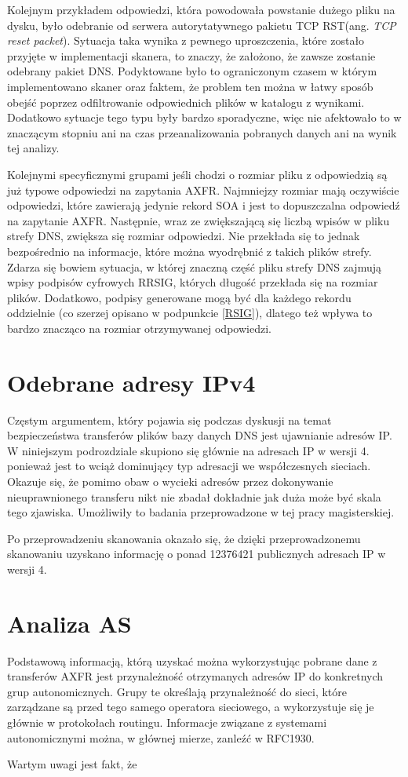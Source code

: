 Kolejnym przykładem odpowiedzi, która powodowała powstanie dużego pliku na dysku, było odebranie od serwera autorytatywnego pakietu TCP RST(ang. \textit{TCP reset packet}). Sytuacja taka wynika z pewnego uproszczenia, które zostało przyjęte w implementacji skanera, to znaczy, że założono, że zawsze zostanie odebrany pakiet DNS. Podyktowane było to ograniczonym czasem w którym implementowano skaner oraz faktem, że problem ten można w łatwy sposób obejść poprzez odfiltrowanie odpowiednich plików w katalogu z wynikami. Dodatkowo sytuacje tego typu były bardzo sporadyczne, więc nie afektowało to w znaczącym stopniu ani na czas przeanalizowania pobranych danych ani na wynik tej analizy.

Kolejnymi specyficznymi grupami jeśli chodzi o rozmiar pliku z odpowiedzią są już typowe odpowiedzi na zapytania AXFR. Najmniejzy rozmiar mają oczywiście odpowiedzi, które zawierają jedynie rekord SOA i jest to dopuszczalna odpowiedź na zapytanie AXFR. Następnie, wraz ze zwiększającą się liczbą wpisów w pliku strefy DNS, zwiększa się rozmiar odpowiedzi. Nie przekłada się to jednak bezpośrednio na informacje, które można wyodrębnić z takich plików strefy. Zdarza się bowiem sytuacja, w której znaczną część pliku strefy DNS zajmują wpisy podpisów cyfrowych RRSIG, których długość przekłada się na rozmiar plików. Dodatkowo, podpisy generowane mogą być dla każdego rekordu oddzielnie (co szerzej opisano w podpunkcie \ref{RSIG}), dlatego też wpływa to bardzo znacząco na rozmiar otrzymywanej odpowiedzi.

\section{Odebrane adresy IPv4}
Częstym argumentem, który pojawia się podczas dyskusji na temat bezpieczeństwa transferów plików bazy danych DNS jest ujawnianie adresów IP. W niniejszym podrozdziale skupiono się głównie na adresach IP w wersji 4. ponieważ jest to wciąż dominujący typ adresacji we współczesnych sieciach. Okazuje się, że pomimo obaw o wycieki adresów przez dokonywanie nieuprawnionego transferu nikt nie zbadał dokładnie jak duża może być skala tego zjawiska. Umożliwiły to badania przeprowadzone w tej pracy magisterskiej.

Po przeprowadzeniu skanowania okazało się, że dzięki przeprowadzonemu skanowaniu uzyskano informację o ponad 12376421 publicznych adresach IP w wersji 4.  

\section{Analiza AS}
Podstawową informacją, którą uzyskać można wykorzystując pobrane dane z transferów AXFR jest przynależność otrzymanych adresów IP do konkretnych grup autonomicznych. Grupy te określają przynależność do sieci, które zarządzane są przed tego samego operatora sieciowego, a wykorzystuje się je głównie w protokołach routingu. Informacje związane z systemami autonomicznymi można, w głównej mierze, zanleźć w RFC1930\cite{RFC1930}.

Wartym uwagi jest fakt, że 

